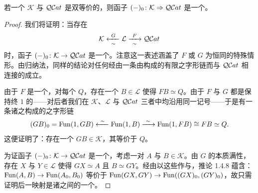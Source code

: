 \begin{proposition}\label{prop:underlying-qcat-biequivalence}
若一个\trInfinityCosmos{} $\mathcal{K}$ 与 $\mathcal{Q}\mathcal{C}at$ 是双等价的，则\trUnderlyingQuasiCategory{}函子 $(-)_{0}\colon\mathcal{K}\Rightarrow\mathcal{Q}\mathcal{C}at$ 是一个\trCosmologicalBiequivalence。
\end{proposition}

\begin{proof}
我们将证明：当存在\trCosmologicalBiequivalence
\begin{equation*}
\mathcal{K}\xleftarrow[\ \sim\ ]{\ G\ }\mathcal{L}\xrightarrow[\ \sim\ ]{\ F\ }\QCat
\end{equation*}
时，\trUnderlyingQuasiCategory{}函子 $(-)_{0}\colon\mathcal{K}\to\mathcal{Q}\mathcal{C}at$ 是一个\trCosmologicalBiequivalence。注意这一表述涵盖了 $F$ 或 $G$ 为恒同\trFunctor{}的特殊情形。由归纳法，同样的结论对任何经由一条由\trBiequivalence{}构成的有限之字形链而与 $\mathcal{Q}\mathcal{C}at$ 相连接的\trInfinityCosmos{}成立。

由于 $F$ 是一个\trBiequivalence，对每个\trQuasiCategory{} $Q$，存在一个\trInfinityCategory{} $B\in\mathcal{L}$ 使得 $FB\simeq Q$。由于 $F$ 与 $G$ 都是保持终\trInfinityCategory{} $1$ 的\trLocalEquivalence——对后者我们在 $\mathcal{K}$、$\mathcal{L}$ 与 $\mathcal{Q}\mathcal{C}at$ 三者中均沿用同一记号——于是有一条诸\trQuasiCategory{}之\trEquivalence{}构成的之字形链
\begin{equation*}
(GB)_{0}=\Fun(1,GB)\xleftarrow{\ \sim\ }\Fun(1,B)\xrightarrow{\ \sim\ }\Fun(1,FB)\cong FB\simeq Q.
\end{equation*}
这便证明了：存在一个\trInfinityCategory{} $GB\in\mathcal{K}$，其\trUnderlyingQuasiCategory{}等价于 $Q$。

为证\trUnderlyingQuasiCategory{}函子 $(-)_{0}\colon\mathcal{K}\to\mathcal{Q}\mathcal{C}at$ 是一个\trLocalEquivalence，考虑一对\trInfinityCategory{} $A$ 与 $B\in\mathcal{K}$。由 $G$ 的本质满性，存在\trInfinityCategory{} $X$ 与 $Y\in\mathcal{L}$ 使得 $GX\simeq A$ 且 $B\simeq GY$。经由以这些\trEquivalence{}作\trPreComposition{}与\trPostComposition，推论 1.4.8 蕴含：$\operatorname{Fun}(A,B)\to\operatorname{Fun}(A_{0},B_{0})$ 等价于 $\operatorname{Fun}(GX,GY)\to\operatorname{Fun}((GX)_{0},(GY)_{0})$，故只需证明后一映射是诸\trQuasiCategory{}之间的一个\trEquivalence。


\end{proof}
